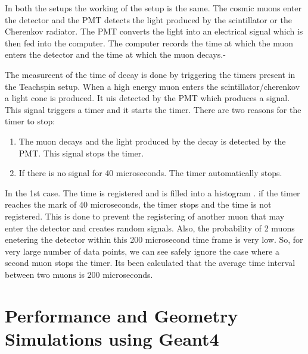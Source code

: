 \documentclass{article}
\begin{document}
\begin{multicols}{2}
In both the setups the working of the setup is the same. The cosmic muons enter the detector and the PMT detects the light produced by the scintillator or the Cherenkov radiator. The PMT converts the light into an electrical signal which is then fed into the computer. The computer records the time at which the muon enters the detector and the time at which the muon decays.-\cite{teachspin}

The measureent of the time of decay is done by triggering the timers present in the Teachspin setup. When a high energy muon enters the scintillator/cherenkov a light cone is produced. It uis detected by the PMT which produces a signal. This signal triggers a timer and it starts the timer. There are two reasons for the timer to stop:
\begin{enumerate}
    \item The muon decays and the light produced by the decay is detected by the PMT. This signal stops the timer.
    \item If there is no signal for 40 microseconds. The timer automatically stops.
\end{enumerate}

In the 1st case. The time is registered and is filled into a histogram . if the timer reaches the mark of 40 microseconds, the timer stops and the time is not registered. This is done to prevent the registering of another muon that may enter the detector and creates random signals.
Also, the probability of 2 muons enetering the detector within this 200 microsecond time frame is very low. So, for very large number of data points, we can see safely ignore the case where a second muon stops the timer. Its been calculated that the average time interval between two muons is 200 microseconds.

\section{\label{simobs}Performance and Geometry Simulations using Geant4}


\end{multicols}
\end{document}

